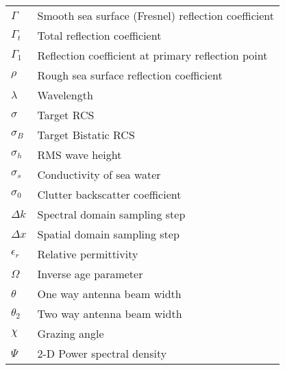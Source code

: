\begin{supertabular}{ll}
$\Gamma$ & Smooth sea surface (Fresnel) reflection coefficient \\
$\Gamma_t$ & Total reflection coefficient \\
$\Gamma_1$ & Reflection coefficient at primary reflection point\\
$\rho$ & Rough sea surface reflection coefficient \\
$\lambda$ & Wavelength \\
$\sigma$ & Target RCS\\
$\sigma_B$ & Target Bistatic RCS \\
$\sigma_h$ & RMS wave height \\
$\sigma_s$ & Conductivity of sea water \\
$\sigma_0$ & Clutter backscatter coefficient \\
$\Delta k$ & Spectral domain sampling step \\
$\Delta x$ & Spatial domain sampling step \\
$\epsilon_r$ & Relative permittivity \\
$\Omega$ & Inverse age parameter \\
$\theta$ & One way antenna beam width \\
$\theta_2$ & Two way antenna beam width \\
$\chi$ & Grazing angle \\
$\Psi $ & 2-D Power spectral density \\
\end{supertabular}